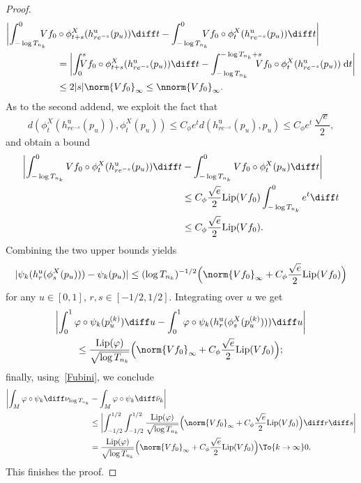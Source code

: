 \begin{appendix}
\begin{proof}
\begin{align*}
\biggl|\int_{-\log{T_{n_k}}}^{0}\hspace*{-3mm}Vf_0&\circ \phi^{X}_{t+s}(h^{\mathrm{u}}_{re^{-s}}(p_u))\diff t-\int_{-\log{T_{n_k}}}^{0}\hspace*{-3mm}Vf_0\circ \phi^{X}_{t}(h^{\mathrm{u}}_{re^{-s}}(p_u))\diff t\biggr|\\
&=
\biggl|\int_{0}^{s}\hspace*{-3mm}Vf_0\circ \phi^{X}_{t+s}(h^{\mathrm{u}}_{re^{-s}}(p_u))\diff t-\int_{-\log{T_{n_k}}}^{-\log{T_{n_k}}+s}\hspace*{-3mm}Vf_0\circ \phi^{X}_{t}(h^{\mathrm{u}}_{re^{-s}}(p_u))\;
\text{d}t\biggr|\\
&\leq 2|s|\norm{Vf_0}_{\infty}\leq \nnorm{Vf_0}_{\infty}.
\end{align*}
As to the second addend, we exploit the fact that
\begin{equation*}d(\phi^{X}_t(h^{\mathrm{u}}_{re^{-s}}(p_u)),\phi^{X}_t(p_u))\leq C_{\phi}e^{t}d(h^{\mathrm{u}}_{re^{-s}}(p_u),p_u)\leq C_{\phi}e^{t}\,\frac{\sqrt{e}}{2},
\end{equation*}
and obtain a bound
\begin{align*}
\biggl|\int_{-\log{T_{n_k}}}^{0}Vf_0\circ \phi^{X}_{t}(h^{\mathrm{u}}_{re^{-s}}(p_u))\diff t&-\int_{-\log{T_{n_k}}}^{0}Vf_0\circ \phi_t^{X}(p_u)\diff t\biggr|\\
&\leq C_{\phi}\frac{\sqrt{e}}{2}\text{Lip}(Vf_0)\int_{-\log{T_{n_k}}}^{0}e^{t}\diff t\\
&\leq C_{\phi}\frac{\sqrt{e}}{2}\text{Lip}(Vf_0).
\end{align*}
Combining the two upper bounds yields
\begin{equation*}
|\psi_k(h^{\mathrm{u}}_r(\phi^{X}_s(p_u)))-\psi_k(p_u)|\leq (\log{T_{n_k}})^{-1/2}\Bigl(\norm{Vf_0}_{\infty}+C_{\phi}\frac{\sqrt{e}}{2}\text{Lip}(Vf_0)\Bigr)
\end{equation*}
for any $u\in [0,1]$, $r,s\in [-1/2,1/2]$. Integrating over $u$ we get
\begin{multline*}
\biggl|\int_{0}^{1}\varphi\circ\psi_k(p_u^{(k)})\diff u-\int_{0}^{1}\varphi\circ\psi_k(h^{\mathrm{u}}_r(\phi^{X}_{s}(p_u^{(k)})))\diff u\biggr|\\
\leq \frac{\text{Lip}(\varphi)}{\sqrt{\log{T_{n_k}}}}\Bigl(\norm{Vf_0}_{\infty}+C_{\phi}\frac{\sqrt{e}}{2}\text{Lip}(Vf_0)\Bigr);
\end{multline*}
finally, using~\eqref{Fubini}, we conclude
\begin{align*}
\biggl|\int_{M}\varphi\circ \psi_k\diff \nu_{\log{T_{n_k}}}&-\int_{M}\varphi\circ \psi_k\diff \bar{\nu}_k \biggr|\\
&\leq\biggl|\int_{-1/2}^{1/2}\int_{-1/2}^{1/2}\frac{\text{Lip}(\varphi)}{\sqrt{\log{T_{n_k}}}} \Bigl(\norm{Vf_0}_{\infty}+C_{\phi}\frac{\sqrt{e}}{2}\text{Lip}(Vf_0) \Bigr)\diff r\diff s\biggr|\\
&= \frac{\text{Lip}(\varphi)}{\sqrt{\log{T_{n_k}}}}\Bigl(\norm{Vf_0}_{\infty}+C_{\phi}\frac{\sqrt{e}}{2}\text{Lip}(Vf_0)\Bigr)\To{k\to\infty}0.
\end{align*}
This finishes the proof.
\end{proof}

\end{appendix}
